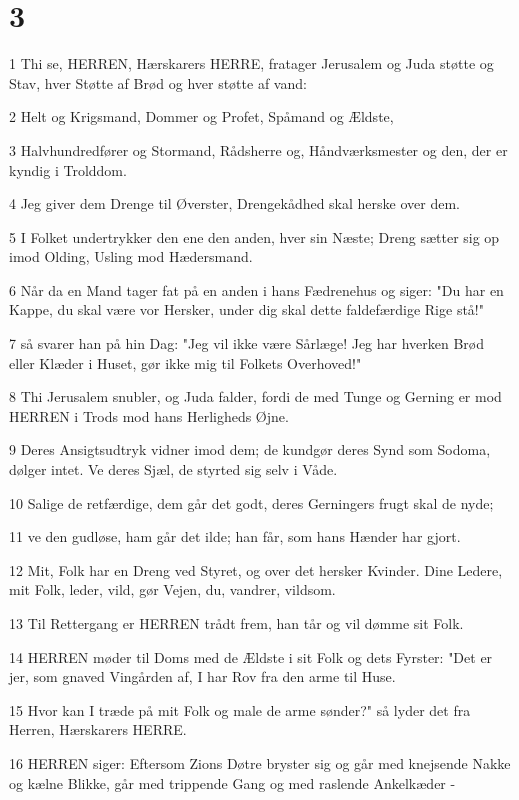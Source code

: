 \chapter{3}

\par 1 Thi se, HERREN, Hærskarers HERRE, fratager Jerusalem og Juda støtte og Stav, hver Støtte af Brød og hver støtte af vand:
\par 2 Helt og Krigsmand, Dommer og Profet, Spåmand og Ældste,
\par 3 Halvhundredfører og Stormand, Rådsherre og, Håndværksmester og den, der er kyndig i Trolddom.
\par 4 Jeg giver dem Drenge til Øverster, Drengekådhed skal herske over dem.
\par 5 I Folket undertrykker den ene den anden, hver sin Næste; Dreng sætter sig op imod Olding, Usling mod Hædersmand.
\par 6 Når da en Mand tager fat på en anden i hans Fædrenehus og siger: "Du har en Kappe, du skal være vor Hersker, under dig skal dette faldefærdige Rige stå!"
\par 7 så svarer han på hin Dag: "Jeg vil ikke være Sårlæge! Jeg har hverken Brød eller Klæder i Huset, gør ikke mig til Folkets Overhoved!"
\par 8 Thi Jerusalem snubler, og Juda falder, fordi de med Tunge og Gerning er mod HERREN i Trods mod hans Herligheds Øjne.
\par 9 Deres Ansigtsudtryk vidner imod dem; de kundgør deres Synd som Sodoma, dølger intet. Ve deres Sjæl, de styrted sig selv i Våde.
\par 10 Salige de retfærdige, dem går det godt, deres Gerningers frugt skal de nyde;
\par 11 ve den gudløse, ham går det ilde; han får, som hans Hænder har gjort.
\par 12 Mit, Folk har en Dreng ved Styret, og over det hersker Kvinder. Dine Ledere, mit Folk, leder, vild, gør Vejen, du, vandrer, vildsom.
\par 13 Til Rettergang er HERREN trådt frem, han tår og vil dømme sit Folk.
\par 14 HERREN møder til Doms med de Ældste i sit Folk og dets Fyrster: "Det er jer, som gnaved Vingården af, I har Rov fra den arme til Huse.
\par 15 Hvor kan I træde på mit Folk og male de arme sønder?" så lyder det fra Herren, Hærskarers HERRE.
\par 16 HERREN siger: Eftersom Zions Døtre bryster sig og går med knejsende Nakke og kælne Blikke, går med trippende Gang og med raslende Ankelkæder -

